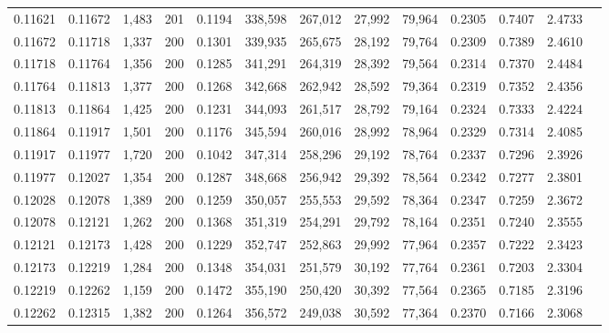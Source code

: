 \begin{tabular}{rrrrrrrrrrrrr}
0.11621 & 0.11672 & 1,483 & 201 &                                     0.1194 & 338,598 & 267,012 &  27,992 &  79,964 & 0.2305 & 0.7407 & 2.4733 \\
0.11672 & 0.11718 & 1,337 & 200 &                                     0.1301 & 339,935 & 265,675 &  28,192 &  79,764 & 0.2309 & 0.7389 & 2.4610 \\
0.11718 & 0.11764 & 1,356 & 200 &                                     0.1285 & 341,291 & 264,319 &  28,392 &  79,564 & 0.2314 & 0.7370 & 2.4484 \\
0.11764 & 0.11813 & 1,377 & 200 &                                     0.1268 & 342,668 & 262,942 &  28,592 &  79,364 & 0.2319 & 0.7352 & 2.4356 \\
0.11813 & 0.11864 & 1,425 & 200 &                                     0.1231 & 344,093 & 261,517 &  28,792 &  79,164 & 0.2324 & 0.7333 & 2.4224 \\
0.11864 & 0.11917 & 1,501 & 200 &                                     0.1176 & 345,594 & 260,016 &  28,992 &  78,964 & 0.2329 & 0.7314 & 2.4085 \\
0.11917 & 0.11977 & 1,720 & 200 &                                     0.1042 & 347,314 & 258,296 &  29,192 &  78,764 & 0.2337 & 0.7296 & 2.3926 \\
0.11977 & 0.12027 & 1,354 & 200 &                                     0.1287 & 348,668 & 256,942 &  29,392 &  78,564 & 0.2342 & 0.7277 & 2.3801 \\
0.12028 & 0.12078 & 1,389 & 200 &                                     0.1259 & 350,057 & 255,553 &  29,592 &  78,364 & 0.2347 & 0.7259 & 2.3672 \\
0.12078 & 0.12121 & 1,262 & 200 &                                     0.1368 & 351,319 & 254,291 &  29,792 &  78,164 & 0.2351 & 0.7240 & 2.3555 \\
0.12121 & 0.12173 & 1,428 & 200 &                                     0.1229 & 352,747 & 252,863 &  29,992 &  77,964 & 0.2357 & 0.7222 & 2.3423 \\
0.12173 & 0.12219 & 1,284 & 200 &                                     0.1348 & 354,031 & 251,579 &  30,192 &  77,764 & 0.2361 & 0.7203 & 2.3304 \\
0.12219 & 0.12262 & 1,159 & 200 &                                     0.1472 & 355,190 & 250,420 &  30,392 &  77,564 & 0.2365 & 0.7185 & 2.3196 \\
0.12262 & 0.12315 & 1,382 & 200 &                                     0.1264 & 356,572 & 249,038 &  30,592 &  77,364 & 0.2370 & 0.7166 & 2.3068 \\

\end{tabular}
